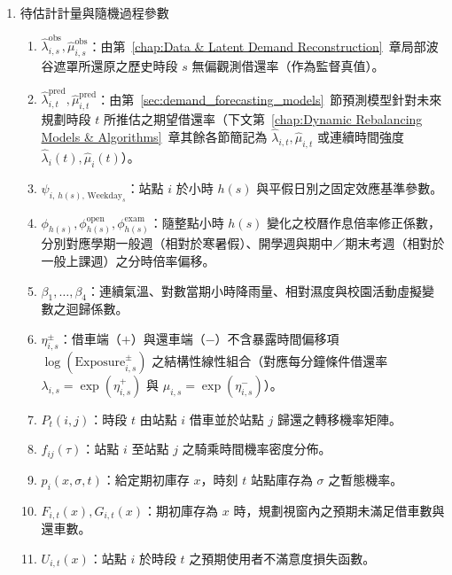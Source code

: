 \begin{enumerate}
\item 待估計計量與隨機過程參數
\begin{enumerate}[label = \textbullet]
    \item $\hat{\lambda}^{\text{obs}}_{i,s}, \hat{\mu}^{\text{obs}}_{i,s}$：由第~\ref{chap:Data & Latent Demand Reconstruction}~章局部波谷遮罩所還原之歷史時段 $s$ 無偏觀測借還率（作為監督真值）。
    \item $\hat{\lambda}^{\text{pred}}_{i,t}, \hat{\mu}^{\text{pred}}_{i,t}$：由第~\ref{sec:demand_forecasting_models}~節預測模型針對未來規劃時段 $t$ 所推估之期望借還率（下文第~\ref{chap:Dynamic Rebalancing Models & Algorithms}~章其餘各節簡記為 $\hat{\lambda}_{i,t}, \hat{\mu}_{i,t}$ 或連續時間強度 $\hat{\lambda}_i(t), \hat{\mu}_i(t)$）。
    \item $\psi_{i,\, h(s),\, \text{Weekday}_s}$：站點 $i$ 於小時 $h(s)$ 與平假日別之固定效應基準參數。
    \item $\phi_{h(s)}, \phi^{\text{open}}_{h(s)}, \phi^{\text{exam}}_{h(s)}$：隨整點小時 $h(s)$ 變化之校曆作息倍率修正係數，分別對應學期一般週（相對於寒暑假）、開學週與期中／期末考週（相對於一般上課週）之分時倍率偏移。
    \item $\beta_1, \dots, \beta_4$：連續氣溫、對數當期小時降雨量、相對濕度與校園活動虛擬變數之迴歸係數。
    \item $\eta^{\pm}_{i,s}$：借車端（$+$）與還車端（$-$）不含暴露時間偏移項 $\log(\text{Exposure}^{\pm}_{i,s})$ 之結構性線性組合（對應每分鐘條件借還率 $\lambda_{i,s} = \exp(\eta^+_{i,s})$ 與 $\mu_{i,s} = \exp(\eta^-_{i,s})$）。
    \item $P_t(i,j)$：時段 $t$ 由站點 $i$ 借車並於站點 $j$ 歸還之轉移機率矩陣。
    \item $f_{ij}(\tau)$：站點 $i$ 至站點 $j$ 之騎乘時間機率密度分佈。
    \item $p_i(x, \sigma, t)$：給定期初庫存 $x$，時刻 $t$ 站點庫存為 $\sigma$ 之暫態機率。
    \item $F_{i,t}(x), G_{i,t}(x)$：期初庫存為 $x$ 時，規劃視窗內之預期未滿足借車數與還車數。
    \item $U_{i,t}(x)$：站點 $i$ 於時段 $t$ 之預期使用者不滿意度損失函數。
\end{enumerate}


\end{enumerate}
